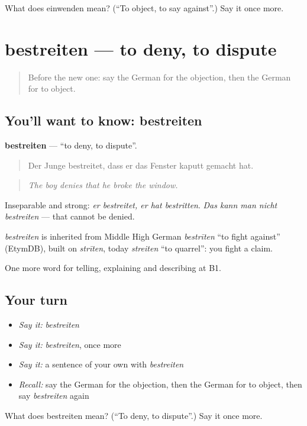 \begin{tcolorbox}[breakable,colback=teal!4,colframe=teal!35!black,title={Before you move on}]
What does einwenden mean? (\textquotedblleft{}To object, to say against\textquotedblright{}.) Say it once more.
\end{tcolorbox}
\section[bestreiten]{bestreiten — to deny, to dispute}

\label{lesson:GE-C333-bestreiten}



\begin{quote}
Before the new one: say the German for the objection, then the German for to object.
\end{quote}

\subsection*{You'll want to know: bestreiten}
\textbf{bestreiten} — \textquotedblleft{}to deny, to dispute\textquotedblright{}.

\begin{quote}
Der Junge bestreitet, dass er das Fenster kaputt gemacht hat.
\end{quote}

\begin{quote}
\emph{The boy denies that he broke the window.}
\end{quote}

Inseparable and strong: \emph{er bestreitet, er hat bestritten}. \emph{Das kann man nicht bestreiten} — that cannot be denied.

\begin{cousinweb}
\emph{bestreiten} is inherited from Middle High German \emph{bestrīten} \textquotedblleft{}to fight against\textquotedblright{} (EtymDB), built on \emph{strīten}, today \emph{streiten} \textquotedblleft{}to quarrel\textquotedblright{}: you fight a claim.
\end{cousinweb}

\begin{grammarlens}[title={What you've built}]
One more word for telling, explaining and describing at B1.
\end{grammarlens}

\subsection*{Your turn}
\begin{itemize}
\raggedright
  \item \emph{Say it:} \emph{bestreiten}
  \item \emph{Say it:} \emph{bestreiten}, once more
  \item \emph{Say it:} a sentence of your own with \emph{bestreiten}
  \item \emph{Recall:} say the German for the objection, then the German for to object, then say \emph{bestreiten} again
\end{itemize}

\begin{tcolorbox}[breakable,colback=teal!4,colframe=teal!35!black,title={Before you move on}]
What does bestreiten mean? (\textquotedblleft{}To deny, to dispute\textquotedblright{}.) Say it once more.
\end{tcolorbox}
